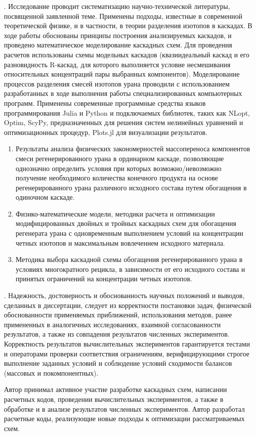 {\methods}.
Исследование проводит систематизацию научно-технической литературы, посвященной заявленной теме.
Применены подходы, известные в современной теоретической физике, и в частности, в теории разделения изотопов в каскадах.
В ходе работы обоснованы принципы построения анализируемых каскадов, и проведено математическое моделирование каскадных схем.
Для проведения расчетов использованы схемы модельных каскадов (квазиидеальный каскад и его разновидность R-каскад, для которого выполняется условие несмешивания относительных концентраций пары выбранных компонентов). Моделирование процессов разделения смесей изотопов урана проводили с использованием разработанных в ходе выполнения работы специализированных компьютерных программ. Применены современные программные средства языков программирования Julia и Python и подключаемых библиотек, таких как NLopt, Optim, ScyPy, предназначенных для решения систем нелинейных уравнений и оптимизационных процедур, Plots.jl для визуализации результатов.

{}
\begin{enumerate}
  \item Результаты анализа физических закономерностей массопереноса компонентов смеси регенерированного урана в ординарном каскаде, позволяющие однозначно определить условия при которых возможно/невозможно получение необходимого количества конечного продукта на основе регенерированного урана различного исходного состава путем обогащения в одиночном каскаде.
  \item Физико-математические модели, методики расчета и оптимизации модифицированных двойных и тройных каскадных схем для обогащения регенерата урана с одновременным выполнением условий на концентрации четных изотопов и максимальным вовлечением исходного материала.
  \item Методика выбора каскадной схемы обогащения регенерированного урана в условиях многократного рецикла, в зависимости от его исходного состава и принятых ограничений на концентрации четных изотопов.
\end{enumerate}

{\reliability}.
Надежность, достоверность и обоснованность научных положений и выводов, сделанных в диссертации, следует из корректности постановки задач, физической обоснованности применяемых приближений, использования методов, ранее примененных в аналогичных исследованиях, взаимной согласованности результатов, а также из совпадения результатов численных экспериментов. Корректность результатов вычислительных экспериментов гарантируется тестами и операторами проверки соответствия ограничениям, верифицирующими строгое выполнение заданных условий и соблюдение условий сходимости балансов (массовых и покомпонентных).


{\contribution} Автор принимал активное участие разработке каскадных схем, написании расчетных кодов, проведении вычислительных экспериментов, а также в обработке и в анализе результатов численных экспериментов. Автор разработал расчетные коды, реализующие новые подходы к оптимизации рассматриваемых схем.


